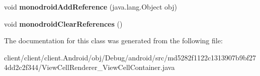 \begin{DoxyCompactItemize}
\item 
\hypertarget{classmd5282f1122c1313907b9bf274dd2c2f344_1_1ViewCellRenderer__ViewCellContainer_ac17100cd9c66974856ba532e505ba43d}{}void {\bfseries monodroid\+Add\+Reference} (java.\+lang.\+Object obj)\label{classmd5282f1122c1313907b9bf274dd2c2f344_1_1ViewCellRenderer__ViewCellContainer_ac17100cd9c66974856ba532e505ba43d}

\item 
\hypertarget{classmd5282f1122c1313907b9bf274dd2c2f344_1_1ViewCellRenderer__ViewCellContainer_aa06fb863fa216a1e9b84d14f30e12abe}{}void {\bfseries monodroid\+Clear\+References} ()\label{classmd5282f1122c1313907b9bf274dd2c2f344_1_1ViewCellRenderer__ViewCellContainer_aa06fb863fa216a1e9b84d14f30e12abe}

\end{DoxyCompactItemize}


The documentation for this class was generated from the following file\+:\begin{DoxyCompactItemize}
\item 
client/client/client.\+Android/obj/\+Debug/android/src/md5282f1122c1313907b9bf274dd2c2f344/View\+Cell\+Renderer\+\_\+\+View\+Cell\+Container.\+java\end{DoxyCompactItemize}
